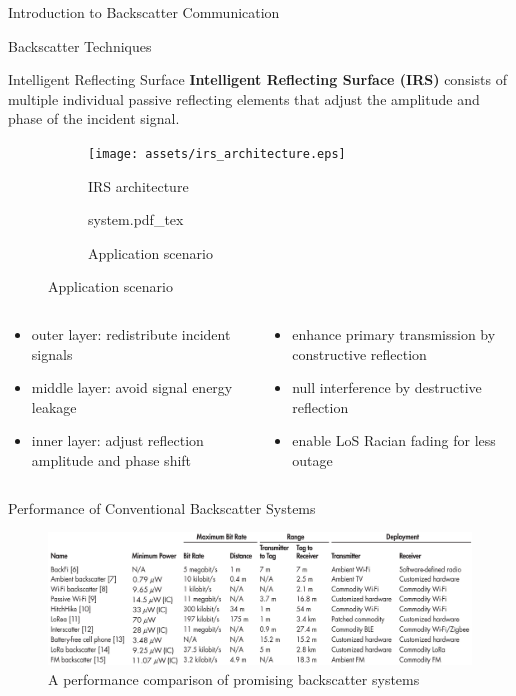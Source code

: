 \documentclass[9pt]{beamer}
\begin{document}
\begin{section}{Introduction to Backscatter Communication}
\begin{subsection}{Backscatter Techniques}
			\begin{frame}{Intelligent Reflecting Surface}
				\textbf{Intelligent Reflecting Surface (IRS)} consists of multiple individual passive reflecting elements that adjust the amplitude and phase of the incident signal.
				\begin{figure}
					\centering
					\begin{subfigure}{.45\textwidth}
						\centering
						\texttt{[image: assets/irs\_architecture.eps]}
						\caption{IRS architecture \cite{Wu2020}}
					\end{subfigure}
					\begin{subfigure}{.45\textwidth}
						\centering
						\def\svgwidth{0.9\columnwidth}
						{system.pdf_tex}
						\caption{Application scenario}
					\end{subfigure}
				\end{figure}
				\begin{columns}
					\begin{column}{0.5\textwidth}
						\begin{itemize}
							\item outer layer: redistribute incident signals
							\item middle layer: avoid signal energy leakage
							\item inner layer: adjust reflection amplitude and phase shift
						\end{itemize}
					\end{column}
					\begin{column}{0.5\textwidth}
						\begin{itemize}
							\item enhance primary transmission by constructive reflection
							\item null interference by destructive reflection
							\item enable LoS Racian fading for less outage
						\end{itemize}
					\end{column}
				\end{columns}
			\end{frame}

			\begin{frame}{Performance of Conventional Backscatter Systems}
				\begin{figure}
					\centering
					\includegraphics[width=\textwidth]{assets/backscatter_performance.png}
					\caption{A performance comparison of promising backscatter systems \cite{Xu2018}}
					\label{fi:backscatter_performance}
				\end{figure}


\end{frame}
\end{subsection}
\end{section}
\end{document}

